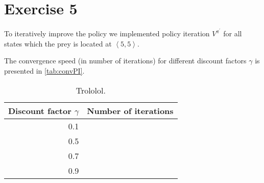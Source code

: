 \documentclass[a4paper,11pt]{article}
\begin{document}
\section*{Exercise 5}
To iteratively improve the policy we implemented policy iteration $V^{\pi^\prime}$ for all states which the prey is located at $\left<5,5\right>$.

The convergence speed (in number of iterations) for different discount factors $\gamma$ is presented in \autoref{tab:convPI}.
\begin{table}
\caption{Trololol.}
\label{tab:convPI}
\begin{center}
\begin{tabular}{|@{ }r@{ }|@{ }r@{ }|}
\hline
Discount factor $\gamma$ & Number of iterations \\
\hline
0.1 & \\
0.5 & \\
0.7 & \\
0.9 & \\
\hline
\end{tabular}
\end{center}
\end{table}

\end{document}
